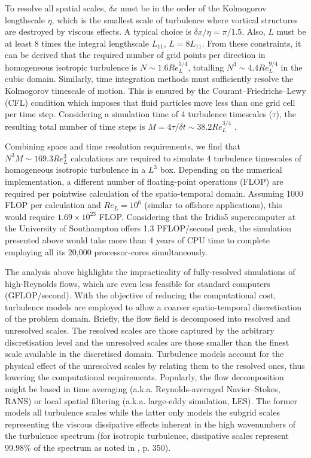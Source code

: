 \documentclass[../main.tex]{subfiles}
\begin{document}
To resolve all spatial scales, $\delta x$ must be in the order of the Kolmogorov lengthscale $\eta$, which is the smallest scale of turbulence where vortical structures are destroyed by viscous effects.
A typical choice is $\delta x/\eta=\pi/1.5$.
Also, $L$ must be at least 8 times the integral lengthscale $L_{11}$, $L=8L_{11}$.
From these constraints, it can be derived that the required number of grid points per direction in homogeneous isotropic turbulence is $N\sim 1.6Re_L^{3/4}$, totalling $N^3\sim 4.4Re_L^{9/4}$ in the cubic domain.
Similarly, time integration methods must sufficiently resolve the Kolmogorov timescale of motion.
This is ensured by the Courant--Friedrichs--Lewy (CFL) condition which imposes that fluid particles move less than one grid cell per time step.
Considering a simulation time of 4 turbulence timescales ($\tau$), the resulting total number of time steps is $M=4\tau/\delta t\sim38.2 Re_{L}^{3/4}$ \citep[p. 346]{Coleman2010,Pope2000}.

Combining space and time resolution requirements, we find that $N^3M\sim169.3 Re_{L}^{3}$ calculations are required to simulate 4 turbulence timescales of homogeneous isotropic turbulence in a $L^3$ box.
Depending on the numerical implementation, a different number of floating-point operations (FLOP) are required per pointwise calculation of the spatio-temporal domain.
Assuming 1000 FLOP per calculation \citep[p. 348]{Pope2000} and $Re_L=10^6$ (similar to offshore applications), this would require $1.69\times10^{23}$ FLOP.
Considering that the Iridis5 supercomputer at the University of Southampton offers 1.3 PFLOP/second peak, the simulation presented above would take more than 4 years of CPU time to complete employing all its 20,000 processor-cores simultaneously.

The analysis above highlights the impracticality of fully-resolved simulations of high-Reynolds flows, which are even less feasible for standard computers (GFLOP/second).
With the objective of reducing the computational cost, turbulence models are employed to allow a coarser spatio-temporal discretisation of the problem domain.
Briefly, the flow field is decomposed into resolved and unresolved scales.
The resolved scales are those captured by the arbitrary discretisation level and the unresolved scales are those smaller than the finest scale available in the discretised domain.
Turbulence models account for the physical effect of the unresolved scales by relating them to the resolved ones, thus lowering the computational requirements.
Popularly, the flow decomposition might be based in time averaging (a.k.a. Reynolds-averaged Navier--Stokes, RANS) or local spatial filtering (a.k.a. large-eddy simulation, LES).
The former models all turbulence scales while the latter only models the subgrid scales representing the viscous dissipative effects inherent in the high wavenumbers of the turbulence spectrum (for isotropic turbulence, dissipative scales represent 99.98\% of the spectrum as noted in \cite{Pope2000}, p. 350).
\end{document}
